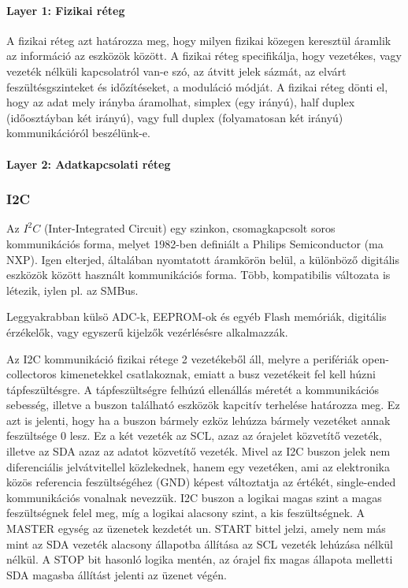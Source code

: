 \paragraph{Layer 1: Fizikai réteg}

A fizikai réteg azt határozza meg, hogy milyen fizikai közegen keresztül áramlik az információ az eszközök között. A fizikai réteg specifikálja, hogy vezetékes, vagy vezeték nélküli kapcsolatról van-e szó, az átvitt jelek sázmát, az elvárt feszültésgszinteket és időzítéseket, a moduláció módját. A fizikai réteg dönti el, hogy az adat mely irányba áramolhat, simplex (egy irányú), half duplex (időosztáyban két irányú), vagy full duplex (folyamatosan két irányú) kommunikációról beszélünk-e.

\paragraph{Layer 2: Adatkapcsolati réteg}



\subsubsection{I2C}

Az $I^2C$ (Inter-Integrated Circuit) egy szinkon, csomagkapcsolt soros kommunikációs forma, melyet 1982-ben definiált a Philips Semiconductor (ma NXP). Igen elterjed, általában nyomtatott áramkörön belül, a különböző digitális eszközök között használt kommunikációs forma. Több, kompatibilis változata is létezik, iylen pl. az SMBus.

Leggyakrabban külsö ADC-k, EEPROM-ok és egyéb Flash memóriák, digitális érzékelők,  vagy egyszerű kijelzők vezérlésésre alkalmazzák.

Az I2C kommunikáció fizikai rétege 2 vezetékeből áll, melyre a perifériák open-collectoros kimenetekkel csatlakoznak, emiatt a busz vezetékeit fel kell húzni tápfeszültésgre. A tápfeszültségre felhúzú ellenállás méretét a kommunikációs sebesség, illetve a buszon található eszközök kapcitív terhelése határozza meg. Ez azt is jelenti, hogy ha a buszon bármely ezköz lehúzza bármely vezetéket annak feszültsége 0 lesz. Ez a két vezeték az SCL, azaz az órajelet közvetítő vezeték, illetve az SDA azaz az adatot közvetítő vezeték. Mivel az I2C buszon jelek nem diferenciális jelvátvitellel közlekednek, hanem egy vezetéken, ami az elektronika közös referencia feszültségéhez (GND) képest változtatja az értékét, single-ended kommunikációs vonalnak nevezzük. I2C buszon a logikai magas szint a magas feszültségnek felel meg, míg a logikai alacsony szint, a kis feszültségnek. A MASTER egység az üzenetek kezdetét un. START bittel jelzi, amely nem más mint az SDA vezeték alacsony állapotba állítása az SCL vezeték lehúzása nélkül nélkül. A STOP bit hasonló logika mentén, az órajel fix magas állapota melletti SDA magasba állítást jelenti az üzenet végén.

